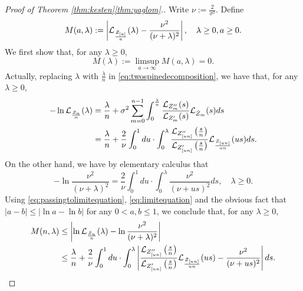 \documentclass[12pt]{amsart}
\numberwithin{equation}{section}
\newcommand{\abs}[1]{\left| #1 \right|}
\newcommand{\expr}[1]{\left( #1 \right)}
\begin{document}
\medskip
\begin{proof}[Proof of Theorem \ref{thm:kesten}\eqref{thm:yaglom}.]
	Write $\nu:=\frac{2}{\sigma^2}$. Define
\begin{equation*}
		M(a,\lambda)
	:=
		\abs{\cL_{\frac{\dot Z_{[a]}}{a}}(\lambda)-
		\frac{\nu^2}{(\nu+\lambda)^2}},
	\quad
		\lambda \geq 0, a\geq 0.
\end{equation*}
	We first show that, for any $\lambda\geq 0$,
\begin{equation}
\label{eq:Miszerofunction}
		M(\lambda)
	:=
		\limsup_{a\to\infty}M(a,\lambda)
	=
		0.
\end{equation}
	Actually, replacing $\lambda$ with $\frac{\lambda}{n}$ in \eqref{eq:twospinedecomposition}, we have that, for any $\lambda\geq 0$,
\begin{equation}
\label{eq:passingtolimitequation}
\begin{split}
		-\ln \cL_{\frac{\dot Z_n}{n}}(\lambda)
	&=
		\frac{\lambda}{n}+\sigma^2\sum_{m=0}^{n-1}\int_0^{\frac{\lambda}{n}} \frac{\cL_{Z''_m}(s)}{\cL_{Z'_m}(s)}\cL_{\dot Z_{m}}(s)ds
	\\&=
		\frac{\lambda}{n}+\frac{2}{\nu}\int_0^1 du \cdot \int_0^{\lambda} \frac{\cL_{Z''_{[un]}}\expr{\frac{s}{n}}}{\cL_{Z'_{[un]}}\expr{\frac{s}{n}}}\cL_{\frac{\dot Z_{[un]}}{un}}(us)ds.
\end{split}
\end{equation}
	On the other hand, we have by elementary calculus that
\begin{equation}
\label{eq:limitequation}
        -\ln\frac{\nu^2}{(\nu+\lambda)^2}
    =
		\frac{2}{\nu}\int_0^1du\cdot\int_0^\lambda \frac{\nu^2}{(\nu+us)^2}ds,
	\quad 
		\lambda\geq 0.
\end{equation}
	Using \eqref{eq:passingtolimitequation}, \eqref{eq:limitequation} and the obvious fact that $\abs{a-b}\leq\abs{\ln a-\ln b}$ for any $0<a,b\leq 1$, we conclude that, for any $\lambda\geq 0$,
\begin{equation}
\label{eq:inequalitybeforepassingtolimit}
\begin{split}
        M(n,\lambda)
    &\leq
		\abs{\ln \cL_{\frac{\dot Z_n}{n}}(\lambda)-\ln\frac{\nu^2}{(\nu+\lambda)^2}}
	\\&\leq
		\frac{\lambda}{n}
	+
	    \frac{2}{\nu}\int_0^1 du
	\cdot
	    \int_0^{\lambda} \abs{\frac{\cL_{Z''_{[un]}}\expr{\frac{s}{n}}}{\cL_{Z'_{[un]}}\expr{\frac{s}{n}}}\cL_{\frac{\dot Z_{[un]}}{un}}(us)- \frac{\nu^2}{(\nu+us)^2}}ds.
\end{split}
\end{equation}

\end{proof}
\end{document}

